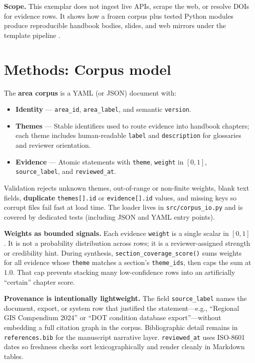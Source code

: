 \documentclass[
]{article}
\providecommand{\tightlist}{%
  \setlength{\itemsep}{0pt}\setlength{\parskip}{0pt}}
\begin{document}
\textbf{Scope.} This exemplar does not ingest live APIs, scrape the web,
or resolve DOIs for evidence rows. It shows how a frozen corpus plus
tested Python modules produce reproducible handbook bodies, slides, and
web mirrors under the template pipeline \citep{template2026}.

\newpage

\section{Methods: Corpus model}\label{methods-corpus-model}

The \textbf{area corpus} is a YAML (or JSON) document with:

\begin{itemize}
\tightlist
\item
  \textbf{Identity} --- \texttt{area\_id}, \texttt{area\_label}, and
  semantic \texttt{version}.
\item
  \textbf{Themes} --- Stable identifiers used to route evidence into
  handbook chapters; each theme includes human-readable \texttt{label}
  and \texttt{description} for glossaries and reviewer orientation.
\item
  \textbf{Evidence} --- Atomic statements with \texttt{theme},
  \texttt{weight} in \([0,1]\), \texttt{source\_label}, and
  \texttt{reviewed\_at}.
\end{itemize}

Validation rejects unknown themes, out-of-range or non-finite weights,
blank text fields, \textbf{duplicate} \texttt{themes{[}{]}.id} or
\texttt{evidence{[}{]}.id} values, and missing keys so corrupt files
fail fast at load time. The loader lives in \texttt{src/corpus\_io.py}
and is covered by dedicated tests (including JSON and YAML entry
points).

\textbf{Weights as bounded signals.} Each evidence \texttt{weight} is a
single scalar in \([0,1]\). It is not a probability distribution across
rows; it is a reviewer-assigned strength or credibility hint. During
synthesis, \texttt{section\_coverage\_score()} sums weights for all
evidence whose \texttt{theme} matches a section's \texttt{theme\_ids},
then caps the sum at \(1.0\). That cap prevents stacking many
low-confidence rows into an artificially ``certain'' chapter score.

\textbf{Provenance is intentionally lightweight.} The field
\texttt{source\_label} names the document, export, or system row that
justified the statement---e.g., ``Regional GIS Compendium 2024'' or
``DOT condition database export''---without embedding a full citation
graph in the corpus. Bibliographic detail remains in
\texttt{references.bib} for the manuscript narrative layer.
\texttt{reviewed\_at} uses ISO-8601 dates so freshness checks sort
lexicographically and render cleanly in Markdown tables.
\end{document}
